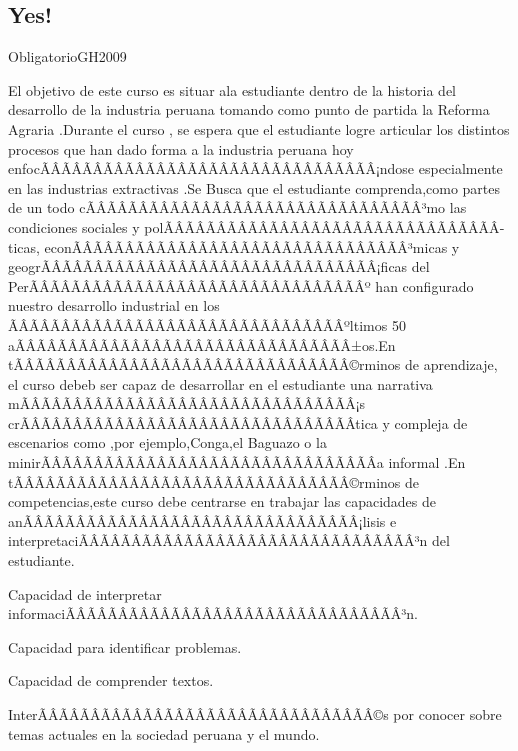 \begin{syllabus}

\section{Yes!}{Obligatorio}{GH2009}

\begin{justification}
El objetivo de este curso es situar ala estudiante dentro de la historia del desarrollo de la industria peruana tomando como punto de partida la Reforma Agraria .Durante el curso , se espera que el estudiante logre articular los distintos 
procesos que han dado forma a  la industria peruana hoy enfocÃÂÃÂÃÂÃÂÃÂÃÂÃÂÃÂÃÂÃÂÃÂÃÂÃÂÃÂÃÂÃÂ¡ndose  especialmente en las industrias extractivas .Se Busca que el estudiante  comprenda,como partes de un todo cÃÂÃÂÃÂÃÂÃÂÃÂÃÂÃÂÃÂÃÂÃÂÃÂÃÂÃÂÃÂÃÂ³mo las condiciones sociales y polÃÂÃÂÃÂÃÂÃÂÃÂÃÂÃÂÃÂÃÂÃÂÃÂÃÂÃÂÃÂÃÂ­ticas,
econÃÂÃÂÃÂÃÂÃÂÃÂÃÂÃÂÃÂÃÂÃÂÃÂÃÂÃÂÃÂÃÂ³micas y geogrÃÂÃÂÃÂÃÂÃÂÃÂÃÂÃÂÃÂÃÂÃÂÃÂÃÂÃÂÃÂÃÂ¡ficas del PerÃÂÃÂÃÂÃÂÃÂÃÂÃÂÃÂÃÂÃÂÃÂÃÂÃÂÃÂÃÂÃÂº  han configurado nuestro desarrollo industrial en los ÃÂÃÂÃÂÃÂÃÂÃÂÃÂÃÂÃÂÃÂÃÂÃÂÃÂÃÂÃÂÃÂºltimos 50 aÃÂÃÂÃÂÃÂÃÂÃÂÃÂÃÂÃÂÃÂÃÂÃÂÃÂÃÂÃÂÃÂ±os.En tÃÂÃÂÃÂÃÂÃÂÃÂÃÂÃÂÃÂÃÂÃÂÃÂÃÂÃÂÃÂÃÂ©rminos de aprendizaje, el curso debeb ser capaz de desarrollar en el estudiante  una narrativa mÃÂÃÂÃÂÃÂÃÂÃÂÃÂÃÂÃÂÃÂÃÂÃÂÃÂÃÂÃÂÃÂ¡s crÃÂÃÂÃÂÃÂÃÂÃÂÃÂÃÂÃÂÃÂÃÂÃÂÃÂÃÂÃÂÃÂ­tica y compleja de escenarios como ,por ejemplo,Conga,el  Baguazo 
o la  minirÃÂÃÂÃÂÃÂÃÂÃÂÃÂÃÂÃÂÃÂÃÂÃÂÃÂÃÂÃÂÃÂ­a informal .En tÃÂÃÂÃÂÃÂÃÂÃÂÃÂÃÂÃÂÃÂÃÂÃÂÃÂÃÂÃÂÃÂ©rminos de competencias,este curso debe centrarse en  trabajar las capacidades de anÃÂÃÂÃÂÃÂÃÂÃÂÃÂÃÂÃÂÃÂÃÂÃÂÃÂÃÂÃÂÃÂ¡lisis e interpretaciÃÂÃÂÃÂÃÂÃÂÃÂÃÂÃÂÃÂÃÂÃÂÃÂÃÂÃÂÃÂÃÂ³n del estudiante.

\end{justification}

\begin{goals}
\item Capacidad de interpretar informaciÃÂÃÂÃÂÃÂÃÂÃÂÃÂÃÂÃÂÃÂÃÂÃÂÃÂÃÂÃÂÃÂ³n.
\item Capacidad para identificar problemas.
\item Capacidad de comprender textos.
\item InterÃÂÃÂÃÂÃÂÃÂÃÂÃÂÃÂÃÂÃÂÃÂÃÂÃÂÃÂÃÂÃÂ©s por conocer sobre temas actuales en la sociedad peruana y el mundo. 
\end{goals}


\end{syllabus}

